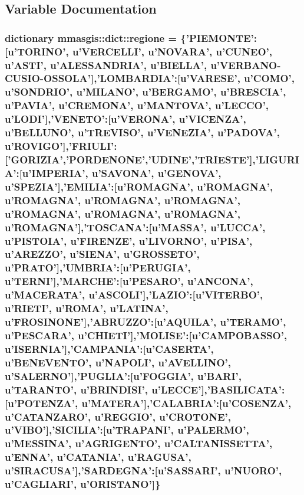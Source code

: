\subsection{Variable Documentation}
\hypertarget{namespacemmasgis_1_1dict_adebad840f47703d850d6cc38a0ae0ba1}{
\subsubsection[{regione}]{\setlength{\rightskip}{0pt plus 5cm}dictionary {\bf mmasgis::dict::regione} = \{'PIEMONTE':\mbox{[}u'TORINO', u'VERCELLI', u'NOVARA', u'CUNEO', u'ASTI', u'ALESSANDRIA', u'BIELLA', u'VERBANO-\/CUSIO-\/OSSOLA'\mbox{]},'LOMBARDIA':\mbox{[}u'VARESE', u'COMO', u'SONDRIO', u'MILANO', u'BERGAMO', u'BRESCIA', u'PAVIA', u'CREMONA', u'MANTOVA', u'LECCO', u'LODI'\mbox{]},'VENETO':\mbox{[}u'VERONA', u'VICENZA', u'BELLUNO', u'TREVISO', u'VENEZIA', u'PADOVA', u'ROVIGO'\mbox{]},'FRIULI':\mbox{[}'GORIZIA','PORDENONE','UDINE','TRIESTE'\mbox{]},'LIGURIA':\mbox{[}u'IMPERIA', u'SAVONA', u'GENOVA', u'SPEZIA'\mbox{]},'EMILIA':\mbox{[}u'ROMAGNA', u'ROMAGNA', u'ROMAGNA', u'ROMAGNA', u'ROMAGNA', u'ROMAGNA', u'ROMAGNA', u'ROMAGNA', u'ROMAGNA'\mbox{]},'TOSCANA':\mbox{[}u'MASSA', u'LUCCA', u'PISTOIA', u'FIRENZE', u'LIVORNO', u'PISA', u'AREZZO', u'SIENA', u'GROSSETO', u'PRATO'\mbox{]},'UMBRIA':\mbox{[}u'PERUGIA', u'TERNI'\mbox{]},'MARCHE':\mbox{[}u'PESARO', u'ANCONA', u'MACERATA', u'ASCOLI'\mbox{]},'LAZIO':\mbox{[}u'VITERBO', u'RIETI', u'ROMA', u'LATINA', u'FROSINONE'\mbox{]},'ABRUZZO':\mbox{[}u'AQUILA', u'TERAMO', u'PESCARA', u'CHIETI'\mbox{]},'MOLISE':\mbox{[}u'CAMPOBASSO', u'ISERNIA'\mbox{]},'CAMPANIA':\mbox{[}u'CASERTA', u'BENEVENTO', u'NAPOLI', u'AVELLINO', u'SALERNO'\mbox{]},'PUGLIA':\mbox{[}u'FOGGIA', u'BARI', u'TARANTO', u'BRINDISI', u'LECCE'\mbox{]},'BASILICATA':\mbox{[}u'POTENZA', u'MATERA'\mbox{]},'CALABRIA':\mbox{[}u'COSENZA', u'CATANZARO', u'REGGIO', u'CROTONE', u'VIBO'\mbox{]},'SICILIA':\mbox{[}u'TRAPANI', u'PALERMO', u'MESSINA', u'AGRIGENTO', u'CALTANISSETTA', u'ENNA', u'CATANIA', u'RAGUSA', u'SIRACUSA'\mbox{]},'SARDEGNA':\mbox{[}u'SASSARI', u'NUORO', u'CAGLIARI', u'ORISTANO'\mbox{]}\}}}
\label{namespacemmasgis_1_1dict_adebad840f47703d850d6cc38a0ae0ba1}
